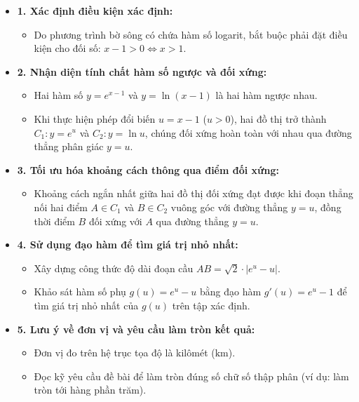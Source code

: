 \documentclass[12pt,a4paper,oneside]{book}
\theoremstyle{theorem}
\theoremstyle{definition}
\begin{document}
\begin{itemize}
    \item \textbf{1. Xác định điều kiện xác định:} 
    \begin{itemize}
        \item Do phương trình bờ sông có chứa hàm số logarit, bắt buộc phải đặt điều kiện cho đối số: $x - 1 > 0 \Leftrightarrow x > 1$.
    \end{itemize}
    \item \textbf{2. Nhận diện tính chất hàm số ngược và đối xứng:}
    \begin{itemize}
        \item Hai hàm số $y = e^{x-1}$ và $y = \ln(x-1)$ là hai hàm ngược nhau.
        \item Khi thực hiện phép đổi biến $u = x - 1$ ($u > 0$), hai đồ thị trở thành $C_1: y = e^u$ và $C_2: y = \ln u$, chúng đối xứng hoàn toàn với nhau qua đường thẳng phân giác $y = u$.
    \end{itemize}
    \item \textbf{3. Tối ưu hóa khoảng cách thông qua điểm đối xứng:}
    \begin{itemize}
        \item Khoảng cách ngắn nhất giữa hai đồ thị đối xứng đạt được khi đoạn thẳng nối hai điểm $A \in C_1$ và $B \in C_2$ vuông góc với đường thẳng $y = u$, đồng thời điểm $B$ đối xứng với $A$ qua đường thẳng $y = u$.
    \end{itemize}
    \item \textbf{4. Sử dụng đạo hàm để tìm giá trị nhỏ nhất:}
    \begin{itemize}
        \item Xây dựng công thức độ dài đoạn cầu $AB = \sqrt{2} \cdot |e^u - u|$.
        \item Khảo sát hàm số phụ $g(u) = e^u - u$ bằng đạo hàm $g'(u) = e^u - 1$ để tìm giá trị nhỏ nhất của $g(u)$ trên tập xác định.
    \end{itemize}
    \item \textbf{5. Lưu ý về đơn vị và yêu cầu làm tròn kết quả:}
    \begin{itemize}
        \item Đơn vị đo trên hệ trục tọa độ là kilômét ($\text{km}$).
        \item Đọc kỹ yêu cầu đề bài để làm tròn đúng số chữ số thập phân (ví dụ: làm tròn tới hàng phần trăm).
    \end{itemize}
\end{itemize}
\end{document}
